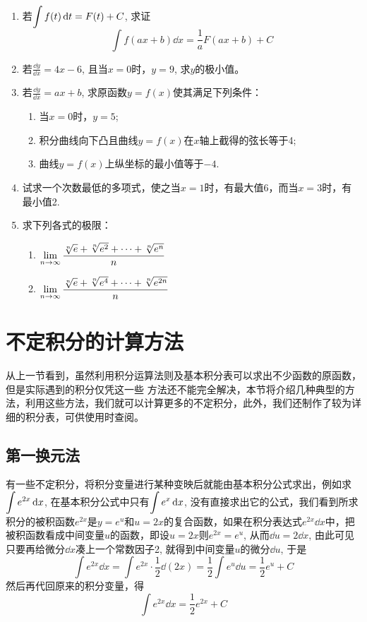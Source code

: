 \begin{ex}
\begin{enumerate}
\item 若$\displaystyle\int f(t)\,{\rm d} t=F(t)+C$, 求证
\[\int f (ax+b) \dd x=\frac{1}{a}F (ax+b) +C\]
\item  若$\frac{\dd y}{\dd x}=4x-6$, 且当$x=0$时，$y=9$, 求$y$的极小值。
\item  若$\frac{\dd y}{\dd x}=ax+b$, 求原函数$y=f(x)$使其满足下列条件：
\begin{enumerate}
    \item 当$x=0$时，$y=5$;
    \item 积分曲线向下凸且曲线$y=f(x)$在$x$轴上截得的弦长等于4;
    \item 曲线$y=f(x)$上纵坐标的最小值等于$-4$.
\end{enumerate}
\item 试求一个次数最低的多项式，使之当$x=1$时，有最大值6，而当$x=3$时，有最小值2.
\item  求下列各式的极限：
\begin{enumerate}
    \item $\displaystyle\lim_{n\to\infty}\dfrac{\sqrt[n]{e}+\sqrt[n]{e^2}+\cdots+\sqrt[n]{e^n}}{n}$
    \item $\displaystyle\lim_{n\to\infty}\dfrac{\sqrt[n]{e}+\sqrt[n]{e^4}+\cdots+\sqrt[n]{e^{2n}}}{n}$
\end{enumerate}
\end{enumerate}

\end{ex}


\section{不定积分的计算方法}
从上一节看到，虽然利用积分运算法则及基本积分表可以求出不少函数的原函数，但是实际遇到的积分仅凭这一些
方法还不能完全解决，本节将介绍几种典型的方法，利用这些方法，我们就可以计算更多的不定积分，此外，我们还制作了较为详细的积分表，可供使用时查阅。

\subsection{第一换元法}

有一些不定积分，将积分变量进行某种变映后就能由基本积分公式求出，例如求$\displaystyle\int e^{2x}\,{\rm d} x$, 在基本积分公式中只有$\displaystyle\int e^x\,{\rm d} x$, 没有直接求出它的公式，我们看到所求积分的被积函数$e^{2x}$是$y=e^u$和$u=2x$的复合函数，如果在积分表达式$e^{2x}\dd x$中，把被积函数看成中间变量$u$的函数，即设$u=2x$则$e^{2x}=e^u$, 从而$\dd u=2\dd x$, 由此可见只要再给微分$\dd x$凑上一个常数因子2, 就得到中间变量$u$的微分$\dd u$, 于是
\[\int e^{2x}\dd x=\int e^{2x}\cdot \frac{1}{2}\dd (2x) =\frac{1}{2}\int e^u\dd u=\frac{1}{2}e^u+C\]
然后再代回原来的积分变量，得
\[\int e^{2x}\dd x=\frac{1}{2}e^{2x}+C\]

